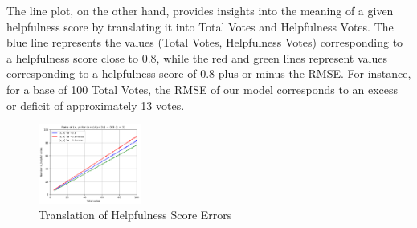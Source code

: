 \noindent
The line plot, on the other hand, provides insights into the meaning of a given helpfulness score by translating it into Total
Votes and Helpfulness Votes. The blue line represents the values (Total Votes, Helpfulness Votes) corresponding to a helpfulness
score close to 0.8, while the red and green lines represent values corresponding to a helpfulness score of 0.8 plus or minus the RMSE.
For instance, for a base of 100 Total Votes, the RMSE of our model corresponds to an excess or deficit of approximately 13 votes.

\begin{figure}[H]
    \centering
    \includegraphics[width=0.3\textwidth]{./figures/model_best_lines.png}
    \caption{Translation of Helpfulness Score Errors}
    \label{fig:model_best_lines}
\end{figure}





